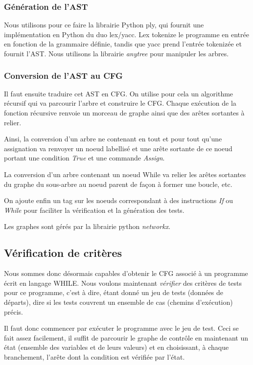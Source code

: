 \documentclass[a4paper, 12pt]{report}
\begin{document}
\subsubsection{Génération de l'AST}

Nous utilisons pour ce faire la librairie Python ply, qui fournit une implémentation en Python du duo lex/yacc. Lex tokenize le programme en entrée en fonction de la grammaire définie, tandis que yacc prend l'entrée tokenizée et fournit l'AST. Nous utilisons la librairie \textit{anytree} pour manipuler les arbres.

\subsubsection{Conversion de l'AST au CFG}

Il faut ensuite traduire cet AST en CFG. On utilise pour cela un algorithme récursif qui va parcourir l'arbre et construire le CFG. Chaque exécution de la fonction récursive renvoie un morceau de graphe ainsi que des arêtes sortantes à relier.

Ainsi, la conversion d'un arbre ne contenant en tout et pour tout qu'une assignation va renvoyer un noeud labellisé et une arête sortante de ce noeud portant une condition \textit{True} et une commande \textit{Assign}.

La conversion d'un arbre contenant un noeud While va relier les arêtes sortantes du graphe du sous-arbre au noeud parent de façon à former une boucle, etc.

On ajoute enfin un tag sur les noeuds correspondant à des instructions \textit{If} ou \textit{While} pour faciliter la vérification et la génération des tests.

Les graphes sont gérés par la librairie python \textit{networkx}.

\subsection{Vérification de critères}

Nous sommes donc désormais capables d'obtenir le CFG associé à un programme écrit en langage WHILE. Nous voulons maintenant \textit{vérifier} des critères de tests pour ce programme, c'est à dire, étant donné un jeu de tests (données de départs), dire si les tests couvrent un ensemble de cas (chemins d'exécution) précis.

Il faut donc commencer par exécuter le programme avec le jeu de test. Ceci se fait assez facilement, il suffit de parcourir le graphe de contrôle en maintenant un état (ensemble des variables et de leurs valeurs) et en choisissant, à chaque branchement, l'arête dont la condition est vérifiée par l'état.
\end{document}
